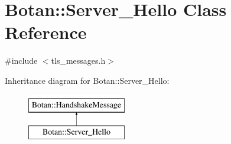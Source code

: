 \hypertarget{classBotan_1_1Server__Hello}{\section{Botan\-:\-:Server\-\_\-\-Hello Class Reference}
\label{classBotan_1_1Server__Hello}
}


{\ttfamily \#include $<$tls\-\_\-messages.\-h$>$}

Inheritance diagram for Botan\-:\-:Server\-\_\-\-Hello\-:\begin{figure}[H]
\begin{center}
\leavevmode
\includegraphics[height=2.000000cm]{classBotan_1_1Server__Hello}
\end{center}
\end{figure}
